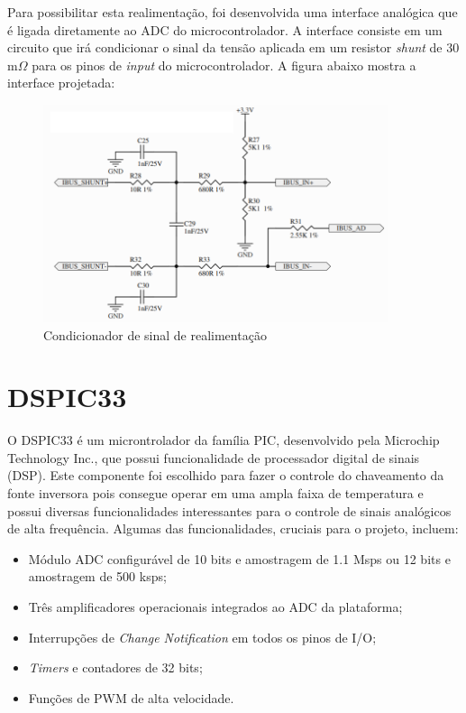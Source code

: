  Para possibilitar esta realimentação, foi desenvolvida uma interface analógica que é ligada diretamente ao ADC do microcontrolador. A interface consiste em um circuito que irá condicionar o sinal da tensão aplicada em um resistor \textit{shunt} de 30 m$\Omega$ para os pinos de \textit{input} do microcontrolador. A figura abaixo mostra a interface projetada:

\begin{figure}[!htb]
    \centering
    \includegraphics[width=0.9\textwidth]{./dados/figuras/proj-shunt}
    \caption{Condicionador de sinal de realimentação}
    \label{fig:proj-shunt}
\end{figure}


\section{DSPIC33}
\label{sec:dsPIC}

O DSPIC33 é um microntrolador da família PIC, desenvolvido pela Microchip Technology Inc., que possui funcionalidade de processador digital de sinais (DSP). Este componente foi escolhido para fazer o controle do chaveamento da fonte inversora pois consegue operar em uma ampla faixa de temperatura e possui diversas funcionalidades interessantes para o controle de sinais analógicos de alta frequência. Algumas das funcionalidades, cruciais para o projeto, incluem:

\begin{itemize}
    \item Módulo ADC configurável de 10 bits e amostragem de 1.1 Msps ou 12 bits e amostragem de 500 ksps;
    \item Três amplificadores operacionais integrados ao ADC da plataforma;
    \item Interrupções de \textit{Change Notification} em todos os pinos de I/O;
    \item \textit{Timers} e contadores de 32 bits;
    \item Funções de PWM de alta velocidade.
\end{itemize} 

